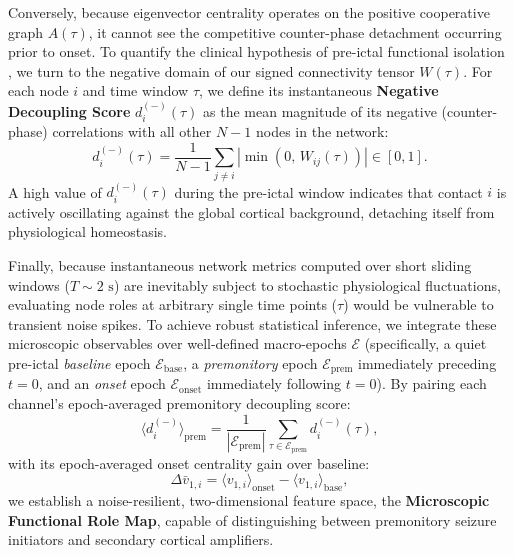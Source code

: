 Conversely, because eigenvector centrality operates on the positive cooperative graph $A(\tau)$, it cannot see the competitive counter-phase detachment occurring prior to onset. To quantify the clinical hypothesis of pre-ictal functional isolation \cite{mormann2003epileptic, jiruska2013synchronization}, we turn to the negative domain of our signed connectivity tensor $W(\tau)$. For each node $i$ and time window $\tau$, we define its instantaneous \textbf{Negative Decoupling Score} $d_i^{(-)}(\tau)$ as the mean magnitude of its negative (counter-phase) correlations with all other $N-1$ nodes in the network:
\begin{equation}
    d_i^{(-)}(\tau) = \frac{1}{N-1} \sum_{j \neq i} \left| \min\!\left(0, \, W_{ij}(\tau)\right) \right| \in [0, 1].
    \label{eq:decoupling_score}
\end{equation}
A high value of $d_i^{(-)}(\tau)$ during the pre-ictal window indicates that contact $i$ is actively oscillating against the global cortical background, detaching itself from physiological homeostasis.

Finally, because instantaneous network metrics computed over short sliding windows ($T \sim 2\text{ s}$) are inevitably subject to stochastic physiological fluctuations, evaluating node roles at arbitrary single time points ($\tau$) would be vulnerable to transient noise spikes. To achieve robust statistical inference, we integrate these microscopic observables over well-defined macro-epochs $\mathcal{E}$ (specifically, a quiet pre-ictal \textit{baseline} epoch $\mathcal{E}_{\text{base}}$, a \textit{premonitory} epoch $\mathcal{E}_{\text{prem}}$ immediately preceding $t=0$, and an \textit{onset} epoch $\mathcal{E}_{\text{onset}}$ immediately following $t=0$). By pairing each channel's epoch-averaged premonitory decoupling score:
\begin{equation}
    \langle d_i^{(-)} \rangle_{\text{prem}} = \frac{1}{|\mathcal{E}_{\text{prem}}|} \sum_{\tau \in \mathcal{E}_{\text{prem}}} d_i^{(-)}(\tau),
    \label{eq:epoch_decoupling}
\end{equation}
with its epoch-averaged onset centrality gain over baseline:
\begin{equation}
    \Delta \bar{v}_{1,i} = \langle v_{1,i} \rangle_{\text{onset}} - \langle v_{1,i} \rangle_{\text{base}},
    \label{eq:epoch_centrality_gain}
\end{equation}
we establish a noise-resilient, two-dimensional feature space, the \textbf{Microscopic Functional Role Map}, capable of distinguishing between premonitory seizure initiators and secondary cortical amplifiers.